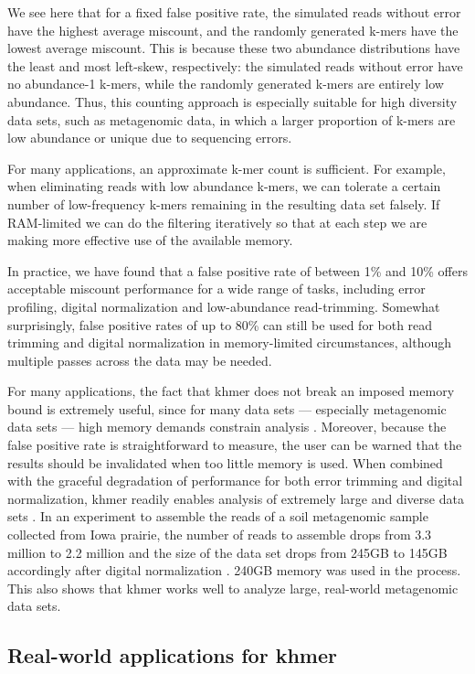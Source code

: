 We see here that for a fixed false positive rate, the simulated reads
without error have the highest average miscount, and the randomly
generated k-mers have the lowest average miscount.  This is because
these two abundance distributions have the least and most left-skew,
respectively: the simulated reads without error have no abundance-1
k-mers, while the randomly generated k-mers are entirely low
abundance. Thus, this counting approach is especially suitable for
high diversity data sets, such as metagenomic data, in which a larger
proportion of k-mers are low abundance or unique due to sequencing
errors.


For many applications, an approximate k-mer count is sufficient.  For
example, when eliminating reads with low abundance k-mers, we can
tolerate a certain number of low-frequency k-mers remaining in the
resulting data set falsely.  If RAM-limited we can do the filtering
iteratively so that at each step we are making more effective use of
the available memory.

In practice, we have found that a false positive rate of between 1\%
and 10\% offers acceptable miscount performance for a wide range of
tasks, including error profiling, digital normalization and
low-abundance read-trimming.  Somewhat surprisingly, false positive rates of up
to 80\% can still be used for both read trimming and digital
normalization in memory-limited circumstances, although multiple
passes across the data may be needed.

For many applications, the fact that khmer does not break an imposed
memory bound is extremely useful, since for many data sets ---
especially metagenomic data sets --- high memory demands constrain
analysis \cite{Howe2012,Luo2009}.  Moreover, because the false
positive rate is straightforward to measure, the user can be warned
that the results should be invalidated when too little memory is used.
When combined with the graceful degradation of performance for both
error trimming and digital normalization, khmer readily enables
analysis of extremely large and diverse data sets \cite{adina2013}. In
an experiment to assemble the reads of a soil metagenomic sample
collected from Iowa prairie, the number of reads to assemble drops
from 3.3 million to 2.2 million and the size of the data set drops from
245GB to 145GB accordingly after digital normalization
\cite{Howe2012}.  240GB memory was used in the process. This also
shows that khmer works well to analyze large, real-world metagenomic data
sets.


\subsection{Real-world applications for khmer}

